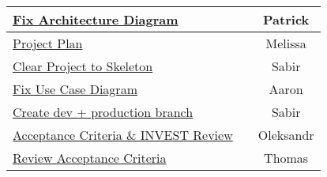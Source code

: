 \begin{tabular}{|l|c|c|}
	\hline
	\href{https://gitlab.rz.uni-bamberg.de/swt/teaching/2021-ws/swt-swl-b/group-a/-/issues/17}{Fix Architecture Diagram} &  & Patrick \\
	\hline
	\href{https://gitlab.rz.uni-bamberg.de/swt/teaching/2021-ws/swt-swl-b/group-a/-/issues/10}{Project Plan} &  & Melissa \\
	\hline
	\href{https://gitlab.rz.uni-bamberg.de/swt/teaching/2021-ws/swt-swl-b/group-a/-/issues/31}{Clear Project to Skeleton} &  & Sabir \\
	\hline
	\href{https://gitlab.rz.uni-bamberg.de/swt/teaching/2021-ws/swt-swl-b/group-a/-/issues/16}{Fix Use Case Diagram} &  & Aaron \\
	\hline
	\href{https://gitlab.rz.uni-bamberg.de/swt/teaching/2021-ws/swt-swl-b/group-a/-/issues/32}{Create dev + production branch} &  & Sabir \\
	\hline
	\href{https://gitlab.rz.uni-bamberg.de/swt/teaching/2021-ws/swt-swl-b/group-a/-/issues/15}{Acceptance Criteria \& INVEST Review} &  & Oleksandr \\
	\hline
	\href{https://gitlab.rz.uni-bamberg.de/swt/teaching/2021-ws/swt-swl-b/group-a/-/issues/36}{Review Acceptance Criteria} &  & Thomas \\
	\hline
\end{tabular}